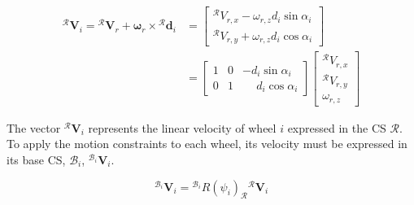 \documentclass[11pt,a4paper]{article}
\newcommand{\vect}[1]{\bm{#1}}       %
\newcommand{\frameR}{\mathcal{R}}
\newcommand{\frameBi}{\mathcal{B}_i}
\begin{document}
\begin{equation}
    \begin{aligned}
        {}^\frameR \vect{V}_{i}
        = {}^\frameR \vect{V}_r + \boldsymbol{\omega}_r \times {}^\frameR \vect{d}_i & = \begin{bmatrix}
                                                                                         {}^\frameR V_{r,x} - \omega_{r,z} d_{i} \sin\alpha_i \\
                                                                                         {}^\frameR V_{r,y} + \omega_{r,z} d_{i} \cos\alpha_i
                                                                                     \end{bmatrix} \\
                                                                                     & = \begin{bmatrix}
                                                                                             1 & 0 & -d_{i} \sin\alpha_i           \\
                                                                                             0 & 1 & \phantom{-}d_{i} \cos\alpha_i
                                                                                         \end{bmatrix} \begin{bmatrix}
                                                                                                           {}^\frameR V_{r,x} \\
                                                                                                           {}^\frameR V_{r,y} \\
                                                                                                           \omega_{r,z}
                                                                                                       \end{bmatrix}
    \end{aligned}
    \label{eq:wheel-velocity-expanded}
\end{equation}

The vector \({}^\frameR \vect{V}_{i}\) represents the linear velocity of wheel \(i\) expressed in the CS \(\frameR\). To apply the motion constraints to each wheel, its velocity must be expressed in its base CS, \(\frameBi\), \({}^{\frameBi} \vect{V}_{i}\).

\begin{equation}
    {}^{\frameBi} \vect{V}_{i} = {}^{\frameBi} R(\psi_i)_{\frameR} {}^\frameR \vect{V}_{i}
    \label{eq:vwheel-transform}
\end{equation}
\end{document}
